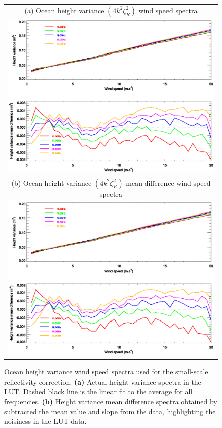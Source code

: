 \begin{figure}[htp]
  \centering
  \begin{tabular}{c}
    \textsf{(a) Ocean height variance $(4k^2\zeta^2_R)$ wind speed spectra}\\
    \includegraphics[bb=85 400 540 560,clip,scale=0.9]{graphics/LUT/sdd_wind_speed_spectra.eps}\\
    \textsf{(b) Ocean height variance $(4k^2\zeta^2_R)$ mean difference wind speed spectra}\\
    \includegraphics[bb=85 225 540 384,clip,scale=0.9]{graphics/LUT/sdd_wind_speed_spectra.eps}
  \end{tabular}
  \caption{Ocean height variance wind speed spectra used for the small-scale reflectivity correction. \textbf{(a)} Actual height variance spectra in the LUT. Dashed black line is the linear fit to the average for all frequencies. \textbf{(b)} Height variance mean difference spectra obtained by subtracted the mean value and slope from the data, highlighting the noisiness in the LUT data.}
  \label{fig:sdd_wind_speed_spectra}
\end{figure}

